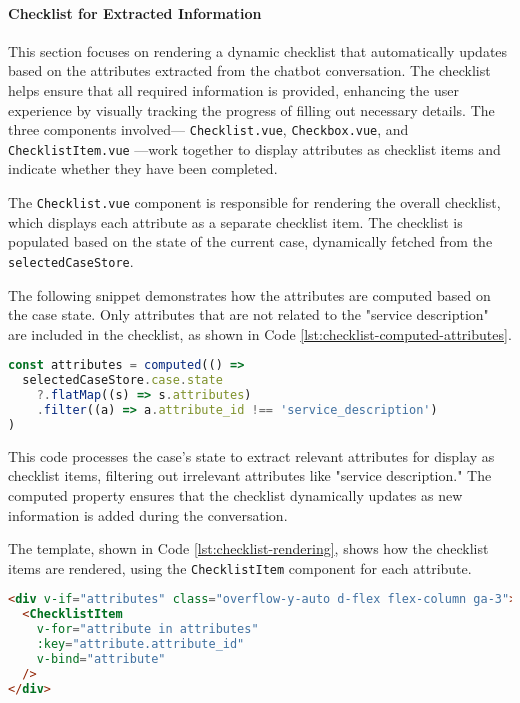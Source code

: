 \paragraph{Checklist for Extracted Information}%

This section focuses on rendering a dynamic checklist that automatically updates based on the attributes extracted from
the chatbot conversation. The checklist helps ensure that all required information is provided, enhancing the user
experience by visually tracking the progress of filling out necessary details. The three components involved—
\texttt{Checklist.vue}, \texttt{Checkbox.vue}, and \texttt{ChecklistItem.vue}
—work together to display attributes as checklist items and indicate whether they have been completed.

The \texttt{Checklist.vue}
component is responsible for rendering the overall checklist, which displays each attribute as a separate checklist
item. The checklist is populated based on the state of the current case, dynamically fetched from the
\texttt{selectedCaseStore}.

The following snippet demonstrates how the attributes are computed based on the case state. Only attributes that are not
related to the "service description" are included in the checklist, as shown in Code
\ref{lst:checklist-computed-attributes}.

\begin{lstlisting}[language=JavaScript, caption={Computing Attributes for Checklist (\texttt{Checklist.vue})},
  firstnumber=6,label={lst:checklist-computed-attributes}]
const attributes = computed(() =>
  selectedCaseStore.case.state
    ?.flatMap((s) => s.attributes)
    .filter((a) => a.attribute_id !== 'service_description')
)
\end{lstlisting}

This code processes the case's state to extract relevant attributes for display as checklist items, filtering
out irrelevant attributes like "service description." The computed
property ensures that the checklist dynamically updates as new information is added during the conversation.

The template, shown in Code \ref{lst:checklist-rendering}, shows how the checklist items are rendered, using the
\texttt{ChecklistItem} component for each attribute.

\begin{lstlisting}[language=HTML, caption={Rendering the Checklist Items (\texttt{Checklist.vue})},
  firstnumber=20,label={lst:checklist-rendering}]
<div v-if="attributes" class="overflow-y-auto d-flex flex-column ga-3">
  <ChecklistItem
    v-for="attribute in attributes"
    :key="attribute.attribute_id"
    v-bind="attribute"
  />
</div>
\end{lstlisting}

